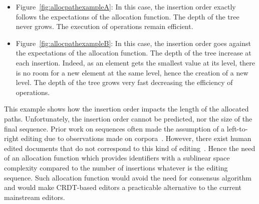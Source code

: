\begin{itemize}[noitemsep, leftmargin=*]
\item Figure~\ref{fig:allocpathexampleA}: In this case, the insertion order
  exactly follows the expectations of the allocation function. The depth of the
  tree never grows. The execution of operations remain efficient.

\item Figure~\ref{fig:allocpathexampleB}: In this case, the insertion order goes
  against the expectations of the allocation function. The depth of the tree
  increase at each insertion. Indeed, as an element gets the smallest value at
  its level, there is no room for a new element at the same level, hence the
  creation of a new level. The depth of the tree grows very fast decreasing the
  efficiency of operations.
\end{itemize}

This example shows how the insertion order impacts the length of the allocated
paths. Unfortunately, the insertion order cannot be predicted, nor the size of
the final sequence. Prior work on sequences often made the assumption of a
left-to-right editing due to observations made on
corpora~\cite{preguica2009commutative, weiss2009logoot}. However, there exist
human edited documents that do not correspond to this kind of
editing~\cite{nedelec2013lseq}.
Hence the need of an allocation function which provides identifiers with a
sublinear space complexity compared to the number of insertions whatever is the
editing sequence. Such allocation function would avoid the need for consensus
algorithm~\cite{mostefaoui2015signature} and would make CRDT-based editors a
practicable alternative to the current mainstream editors.
 
